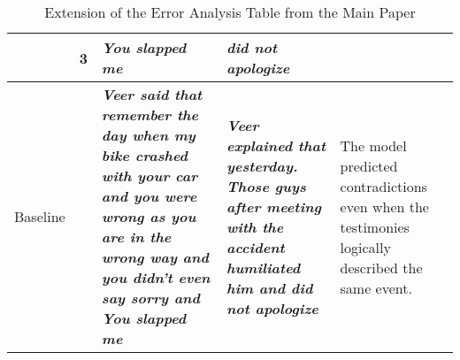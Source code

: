 \begin{table*}[!ht]
{\begin{tabular}{lcp{25em}p{25em}p{25em}}
 & 3 & \textcolor{red!90}{\emph{\textbf{You slapped me}}} & \textcolor{red!90}{\emph{\textbf{did not apologize}}}
  & \multirow{3}{*}{} \\ \midrule{}

 Baseline & & \textcolor{red!90}{\emph{\textbf{Veer said that remember the day when my bike crashed with your car and you were wrong as you are in the wrong way and you didn't even say sorry and You slapped me}}} & \textcolor{red!90}{\emph{\textbf{Veer explained that yesterday. Those guys after meeting with the accident humiliated him and did not apologize}}} & 
  \multirow{3}{20em}{The model predicted contradictions even when the testimonies logically described the same event.} \\ 




 

























 

\bottomrule



\end{tabular}}


\caption{Extension of the Error Analysis Table from the Main Paper}
\label{tab:error-appendix}
\end{table*}










